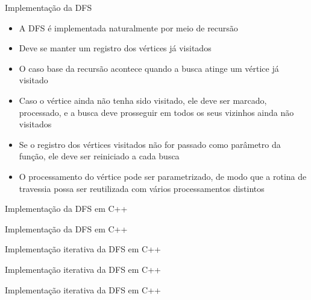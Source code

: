 \begin{frame}[fragile]{Implementação da DFS}

    \begin{itemize}
        \item A DFS é implementada naturalmente por meio de recursão

        \item Deve se manter um registro dos vértices já visitados

        \item O caso base da recursão acontece quando a busca atinge um vértice já visitado

        \item Caso o vértice ainda não tenha sido visitado, ele deve ser marcado, processado, e
            a busca deve prosseguir em todos os seus vizinhos ainda não visitados
      
        \item Se o registro dos vértices visitados não for passado como parâmetro da função,
            ele deve ser reiniciado a cada busca

        \item O processamento do vértice pode ser parametrizado, de modo que a rotina de
            travessia possa ser reutilizada com vários processamentos distintos
    \end{itemize}

\end{frame}

\begin{frame}[fragile]{Implementação da DFS em C++}
\end{frame}

\begin{frame}[fragile]{Implementação da DFS em C++}
\end{frame}

\begin{frame}[fragile]{Implementação iterativa da DFS em C++}
\end{frame}

\begin{frame}[fragile]{Implementação iterativa da DFS em C++}
\end{frame}

\begin{frame}[fragile]{Implementação iterativa da DFS em C++}
\end{frame}
